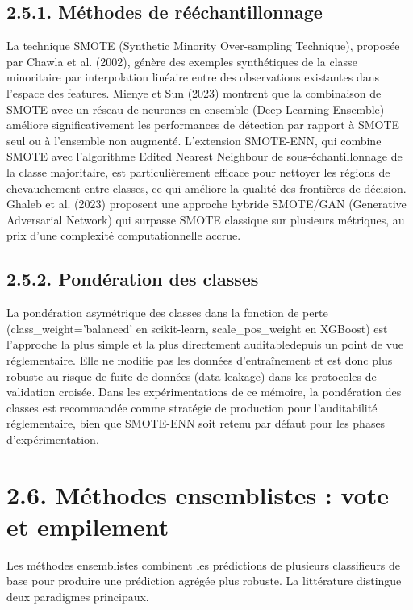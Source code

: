 \subsection{2.5.1. Méthodes de rééchantillonnage}

La technique SMOTE (Synthetic Minority Over-sampling Technique), proposée par Chawla et al. (2002), génère des exemples synthétiques de la classe minoritaire par interpolation linéaire entre des observations existantes dans l'espace des features. Mienye et Sun (2023) montrent que la combinaison de SMOTE avec un réseau de neurones en ensemble (Deep Learning Ensemble) améliore significativement les performances de détection par rapport à SMOTE seul ou à l'ensemble non augmenté. L'extension SMOTE-ENN, qui combine SMOTE avec l'algorithme Edited Nearest Neighbour de sous-échantillonnage de la classe majoritaire, est particulièrement efficace pour nettoyer les régions de chevauchement entre classes, ce qui améliore la qualité des frontières de décision. Ghaleb et al. (2023) proposent une approche hybride SMOTE/GAN (Generative Adversarial Network) qui surpasse SMOTE classique sur plusieurs métriques, au prix d'une complexité computationnelle accrue.

\subsection{2.5.2. Pondération des classes}

La pondération asymétrique des classes dans la fonction de perte (class\_weight='balanced' en scikit-learn, scale\_pos\_weight en XGBoost) est l'approche la plus simple et la plus directement auditabledepuis un point de vue réglementaire. Elle ne modifie pas les données d'entraînement et est donc plus robuste au risque de fuite de données (data leakage) dans les protocoles de validation croisée. Dans les expérimentations de ce mémoire, la pondération des classes est recommandée comme stratégie de production pour l'auditabilité réglementaire, bien que SMOTE-ENN soit retenu par défaut pour les phases d'expérimentation.

\section{2.6. Méthodes ensemblistes : vote et empilement}

Les méthodes ensemblistes combinent les prédictions de plusieurs classifieurs de base pour produire une prédiction agrégée plus robuste. La littérature distingue deux paradigmes principaux.

